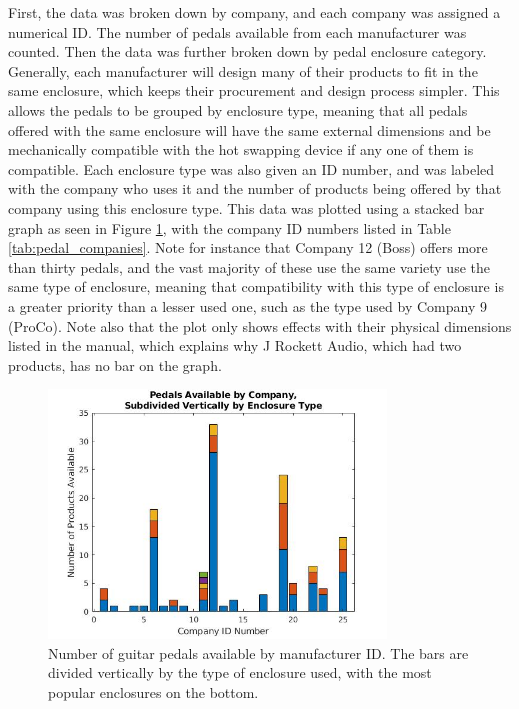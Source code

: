 		First, the data was broken down by company, and each company was assigned a numerical ID.  The number of pedals available from each manufacturer was counted.  Then the data was further broken down by pedal enclosure category.  Generally, each manufacturer will design many of their products to fit in the same enclosure, which keeps their procurement and design process simpler.  This allows the pedals to be grouped by enclosure type, meaning that all pedals offered with the same enclosure will have the same external dimensions and be mechanically compatible with the hot swapping device if any one of them is compatible.  Each enclosure type was also given an ID number, and was labeled with the company who uses it and the number of products being offered by that company using this enclosure type.  This data was plotted using a stacked bar graph as seen in Figure \ref{fig:pedalsAvailable}, with the company ID numbers listed in Table \ref{tab:pedal_companies}.  Note for instance that Company 12 (Boss) offers more than thirty pedals, and the vast majority of these use the same variety use the same type of enclosure, meaning that compatibility with this type of enclosure is a greater priority than a lesser used one, such as the type used by Company 9 (ProCo).  Note also that the plot only shows effects with their physical dimensions listed in the manual, which explains why J Rockett Audio, which had two products, has no bar on the graph.

		\begin{figure}
			\centering
			\includegraphics[width = 0.8\textwidth]{PR4Images/PedalsAvailable.jpg}
			\caption{Number of guitar pedals available by manufacturer ID.  The bars are divided vertically by the type of enclosure used, with the most popular enclosures on the bottom.}
			\label{fig:pedalsAvailable}
		\end{figure}


